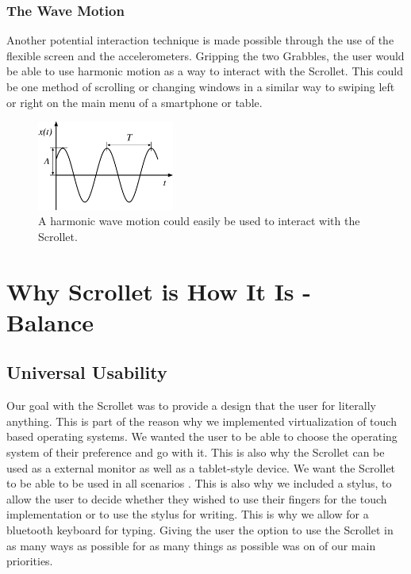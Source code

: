 \documentclass[a4paper]{article}
\begin{document}
\subsubsection{The Wave Motion}
Another potential interaction technique is made possible through the use of the flexible screen and the accelerometers. Gripping the two Grabbles, the user would be able to use harmonic motion as a way to interact with the Scrollet. This could be one method of scrolling or changing windows in a similar way to swiping left or right on the main menu of a smartphone or table.
\begin{figure}[H]
\centering
\includegraphics[width=0.4\textwidth]{harmonicwave.png}
\caption{A harmonic wave motion could easily be used to interact with the Scrollet.}
\end{figure}


\section{Why Scrollet is How It Is - Balance}
\subsection{Universal Usability}
Our goal with the Scrollet was to provide a design that the user for literally anything. This is part of the reason why we implemented virtualization of touch based operating systems. We wanted the user to be able to choose the operating system of their preference and go with it. This is also why the Scrollet can be used as a external monitor as well as a tablet-style device. We want the Scrollet to be able to be used in all scenarios \cite{Nielsen}. This is also why we included a stylus, to allow the user to decide whether they wished to use their fingers for the touch implementation or to use the stylus for writing. This is why we allow for a bluetooth keyboard for typing. Giving the user the option to use the Scrollet in as many ways as possible for as many things as possible was on of our main priorities.
\end{document}
